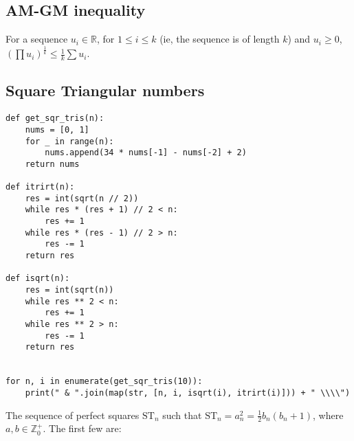 \documentclass[a4paper,11pt]{article}
\newenvironment{longlisting}
{\addvspace{\baselineskip}\captionsetup{type=listing}}
{\addvspace{\baselineskip}}
\begin{document}
    \subsection{AM-GM inequality}

    For a sequence $u_i \in \mathbb{R}$, for $1 \le i \le k$ (ie, the sequence
    is of length $k$) and $u_i \ge 0$,
    \\$(\prod u_i)^\frac{1}{k} \le \frac{1}{k}\sum u_i$.

    \subsection{Square Triangular numbers}


    \begin{longlisting}
    \begin{verbatim}
def get_sqr_tris(n):
    nums = [0, 1]
    for _ in range(n):
        nums.append(34 * nums[-1] - nums[-2] + 2)
    return nums

def itrirt(n):
    res = int(sqrt(n // 2))
    while res * (res + 1) // 2 < n:
        res += 1
    while res * (res - 1) // 2 > n:
        res -= 1
    return res

def isqrt(n):
    res = int(sqrt(n))
    while res ** 2 < n:
        res += 1
    while res ** 2 > n:
        res -= 1
    return res


for n, i in enumerate(get_sqr_tris(10)):
    print(" & ".join(map(str, [n, i, isqrt(i), itrirt(i)])) + " \\\\")

    \end{verbatim}
    \end{longlisting}

    The sequence of perfect squares $\text{ST}_n$ such that
    $\text{ST}_n= a_n^2 = \frac 12 b_n(b_n + 1)$, where
    $a, b \in \mathbb{Z}_0^+$. The first few are:
\end{document}
